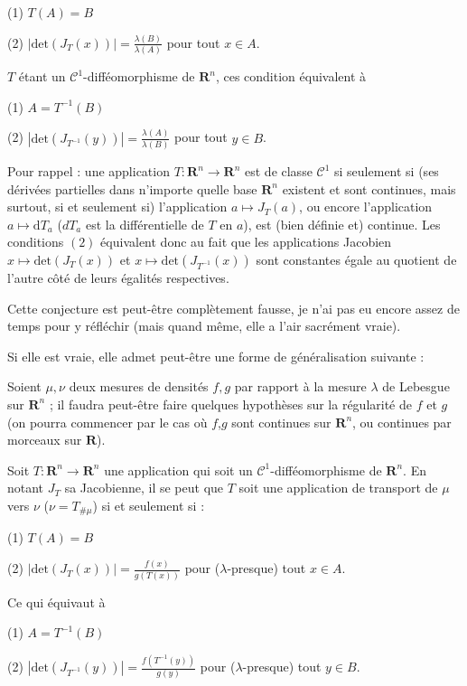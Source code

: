 \documentclass[12pt]{article}
\begin{document}
(1) $T(A) = B$ 

(2) $ \displaystyle \left|\mathrm{det} (J_T(x))\right| = \frac{\lambda(B)}{\lambda(A)}  $ pour tout $x \in A$.

$T$ étant un $\mathcal C^1$-difféomorphisme de $ \mathbf R^n $, ces condition équivalent à

(1) $A = T^{-1}(B)$ 

(2) $ \displaystyle \left|\mathrm{det} (J_{T^{-1}}(y))\right| = \frac{\lambda(A)}{\lambda(B)} $ pour tout $y \in B$.

Pour rappel : une application $ T : \mathbf R^n \to \mathbf R^n $ est de classe $ \mathcal C^1 $ si seulement si (ses dérivées partielles dans n'importe quelle base $\mathbf R^n $ existent et sont continues, mais surtout, si et seulement si) l'application $ a \mapsto J_T(a) $, ou encore l'application $ a \mapsto \mathrm d T_{a} $ ($d T_{a}$ est la différentielle de $T$ en $a$), est (bien définie et) continue. Les conditions $(2)$ équivalent donc au fait que les applications Jacobien $ x \mapsto \mathrm{det} (J_T(x)) $ et $ x \mapsto \mathrm{det} (J_{T^{-1}}(x)) $ sont constantes égale au quotient de l'autre côté de leurs égalités respectives.

Cette conjecture est peut-être complètement fausse, je n'ai pas eu encore assez de temps pour y réfléchir (mais quand même, elle a l'air sacrément vraie).

Si elle est vraie, elle admet peut-être une forme de généralisation suivante : 

Soient $\mu, \nu $ deux mesures de densités $ f,g $ par rapport à la mesure $ \lambda $ de Lebesgue sur $ \mathbf R^n $ ; il faudra peut-être faire quelques hypothèses sur la régularité de $f$ et $g$ (on pourra commencer par le cas où $f$,$g$ sont continues sur $ \mathbf R^n$, ou continues par morceaux sur $\mathbf R$).

Soit $ T : \mathbf R^n \to \mathbf R^n $ une application qui soit un $\mathcal C^1$-difféomorphisme de $\mathbf R^n$. En notant $ J_T $ sa Jacobienne, il se peut que $T$ soit une application de transport de $ \mu $ vers $ \nu $ ($ \nu = T_{\# \mu } $) si et seulement si :

(1) $T(A) = B$ 

(2) $ \displaystyle \left|\mathrm{det} (J_T(x))\right| = \frac{f(x)}{g(T(x))}  $ pour ($\lambda$-presque) tout $x \in A$.

Ce qui équivaut à

(1) $A = T^{-1}(B)$ 

(2) $ \displaystyle \left|\mathrm{det} (J_{T^{-1}}(y)) \right| = \frac{f(T^{-1}(y))}{g(y)} $ pour ($\lambda$-presque) tout $y \in B$.
\end{document}
